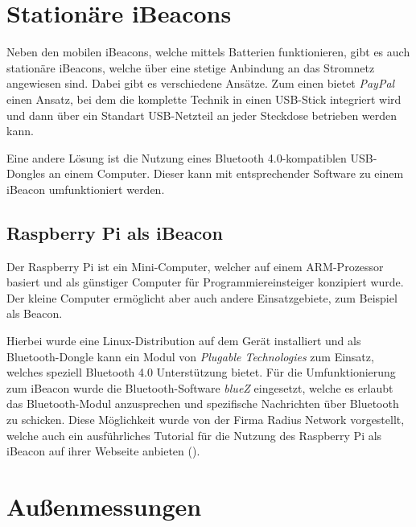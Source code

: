 \section{Stationäre iBeacons}
\label{sec:dataandmeasurement:stationarybeacon}
Neben den mobilen iBeacons, welche mittels Batterien funktionieren, gibt es auch stationäre iBeacons, welche über eine stetige Anbindung an das Stromnetz angewiesen sind.
Dabei gibt es verschiedene Ansätze.
Zum einen bietet \emph{PayPal} einen Ansatz, bei dem die komplette Technik in einen USB-Stick integriert wird und dann über ein Standart USB-Netzteil an jeder Steckdose betrieben werden kann.

Eine andere Lösung ist die Nutzung eines Bluetooth 4.0-kompatiblen USB-Dongles an einem Computer. Dieser kann mit entsprechender Software zu einem iBeacon umfunktioniert werden.

\subsection{Raspberry Pi als iBeacon}
\label{sec:dataandmeasurement:stationarybeacon:raspberrypi}
Der Raspberry Pi ist ein Mini-Computer, welcher auf einem ARM-Prozessor basiert und als günstiger Computer für Programmiereinsteiger konzipiert wurde. Der kleine Computer ermöglicht aber auch andere Einsatzgebiete, zum Beispiel als Beacon.

Hierbei wurde eine Linux-Distribution auf dem Gerät installiert und als Bluetooth-Dongle kann ein Modul von \emph{Plugable Technologies} zum Einsatz, welches speziell Bluetooth 4.0 Unterstützung bietet.
Für die Umfunktionierung zum iBeacon wurde die Bluetooth-Software \emph{blueZ} eingesetzt, welche es erlaubt das Bluetooth-Modul anzusprechen und spezifische Nachrichten über Bluetooth zu schicken.
Diese Möglichkeit wurde von der Firma Radius Network vorgestellt, welche auch ein ausführliches Tutorial für die Nutzung des Raspberry Pi als iBeacon auf ihrer Webseite anbieten (\citet{radiusraspberry}).



\section{Außenmessungen}
\label{sec:dataandmeasurement:outdoormeasure}

